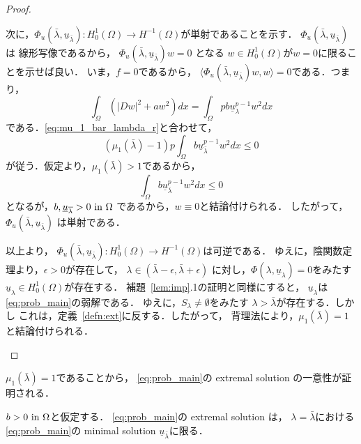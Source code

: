 \begin{proof}
\begin{enumerate}[1.]
        次に，$\Phi_u (\bar{\lambda}, \underline{u}_{\bar{\lambda}}) \colon
        H_0^1(\Omega) \to H^{-1}(\Omega)$が単射であることを示す．
        $\Phi_u (\bar{\lambda}, \underline{u}_{\bar{\lambda}})$は
        線形写像であるから，
        $\Phi_u (\bar{\lambda}, \underline{u}_{\bar{\lambda}})w = 0$
        となる
        $w \in H_0^1(\Omega)$が$w = 0$に限ることを示せば良い．
        いま，$f = 0$であるから，
        $\langle \Phi_u (\bar{\lambda},
        \underline{u}_{\bar{\lambda}})w , w \rangle = 0$である．つまり，
        \[
         \int_\Omega \left( \lvert Dw \rvert^2 + aw^2 \right)dx =
        \int_\Omega p b\underline{u}_\lambda^{p-1} w^2 dx
        \]
        である．\eqref{eq:mu_1_bar_lambda_r}と合わせて，
        \[
         \left( \mu_1(\bar{\lambda}) - 1 \right) p \int_\Omega b
        \underline{u}_{\bar{\lambda}}^{p-1} w^2 dx \leq 0
        \]
        が従う．仮定より，$\mu_1 ( \bar{\lambda}) > 1$であるから，
        \[
         \int_\Omega b
        \underline{u}_{\bar{\lambda}}^{p-1} w^2 dx \leq 0 
        \]
        となるが，$b , \underline{u}_{\overline{\lambda}} > 0 ~\text{in}~ \Omega$
        であるから，$w \equiv 0$と結論付けられる．
        したがって，
        $\Phi_u (\bar{\lambda}, \underline{u}_{\bar{\lambda}})$
        は単射である．

        以上より，
        $\Phi_u (\bar{\lambda}, \underline{u}_{\bar{\lambda}}) \colon
        H_0^1(\Omega) \to H^{-1}(\Omega)$は可逆である．
        ゆえに，陰関数定理より，$\epsilon > 0$が存在して，
        $\lambda \in (\bar{\lambda} - \epsilon, \bar{\lambda} +
        \epsilon)$
        に対し，$\Phi (\lambda, \underline{u}_{\lambda}) = 0$をみたす
        $\underline{u}_\lambda \in H_0^1(\Omega)$が存在する．
        補題~\ref{lem:imp}.1の証明と同様にすると，
        $\underline{u}_\lambda$は\ref{eq:prob_main}の弱解である．
        ゆえに，$S_\lambda \neq \emptyset$をみたす
        $\lambda > \bar{\lambda}$が存在する．しかし
        これは，定義~\ref{defn:ext}に反する．したがって，
        背理法により，$\mu_1(\bar{\lambda}) = 1$と結論付けられる．
 \end{enumerate}
\end{proof}

$\mu_1(\bar{\lambda}) = 1$であることから，
\ref{eq:prob_main}の extremal solution の一意性が証明される．

\begin{prop} \label{prop:ext_uni}
 $b > 0 ~\text{in}~ \Omega$と仮定する．
 \ref{eq:prob_main}の extremal solution は，
 $\lambda = \bar{\lambda}$における\ref{eq:prob_main}の minimal
 solution $\underline{u}_{\bar{\lambda}}$に限る．
\end{prop}

